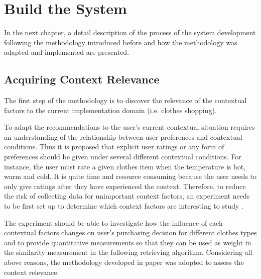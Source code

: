 \chapter{Build the System}\label{chapter:build}

In the next chapter, a detail description of the process of the system development following the methodology introduced before and how the methodology was adapted and implemented are presented. 

\section{Acquiring Context Relevance} \label{sec:acr}

The first step of the methodology is to discover the relevance of the contextual factors to the current implementation domain (i.e. clothes shopping). 

To adapt the recommendations to the user's current contextual situation requires an understanding of the relationship between user preferences and contextual conditions. Thus it is proposed that explicit user ratings or any form of preferences should be given under several different contextual conditions. For instance, the user must rate a given clothes item when the temperature is hot, warm and cold. It is quite time and resource consuming because the user needs to only give ratings after they have experienced the context. Therefore, to reduce the risk of collecting data for unimportant context factors, an experiment needs to be first set up to determine which context factors are interesting to study \cite{ref:18}. 

The experiment should be able to investigate how the influence of each contextual factors changes on user's purchasing decision for different clothes types and to provide quantitative measurements so that they can be used as weight in the similarity measurement in the following retrieving algorithm. Considering all above reasons, the methodology developed in paper \cite{ref:18} was adopted to assess the context relevance.

